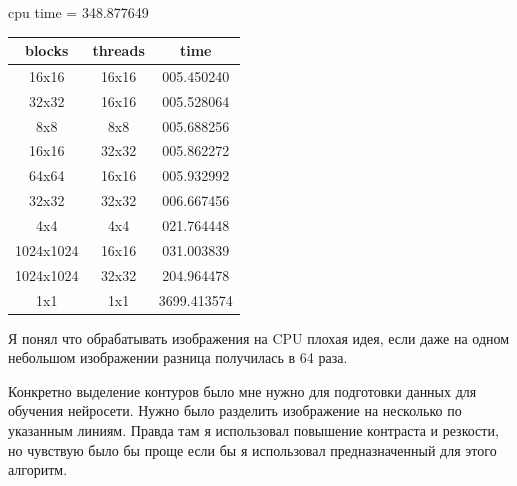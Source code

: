\documentclass[12pt]{article}
\begin{document}
\begin{center}
	cpu time = 348.877649
	\begin{table}[!htb]
		\centering
		\begin{tabular}{|c|c|c|}
			\hline
			blocks    & threads & time        \\
			\hline
			16x16     & 16x16   & 005.450240  \\
			32x32     & 16x16   & 005.528064  \\
			8x8       & 8x8     & 005.688256  \\
			16x16     & 32x32   & 005.862272  \\
			64x64     & 16x16   & 005.932992  \\
			32x32     & 32x32   & 006.667456  \\
			4x4       & 4x4     & 021.764448  \\
			1024x1024 & 16x16   & 031.003839  \\
			1024x1024 & 32x32   & 204.964478  \\
			1x1       & 1x1     & 3699.413574 \\
			\hline
		\end{tabular}
	\end{table}
\end{center}



Я понял что обрабатывать изображения на CPU плохая идея, если даже на одном небольшом изображении
разница получилась в 64 раза.

Конкретно выделение контуров было мне нужно для подготовки данных для обучения нейросети.
Нужно было разделить изображение на несколько по указанным линиям.
Правда там я использовал повышение контраста и резкости,
но чувствую было бы проще если бы я использовал предназначенный для этого алгоритм.
\end{document}
